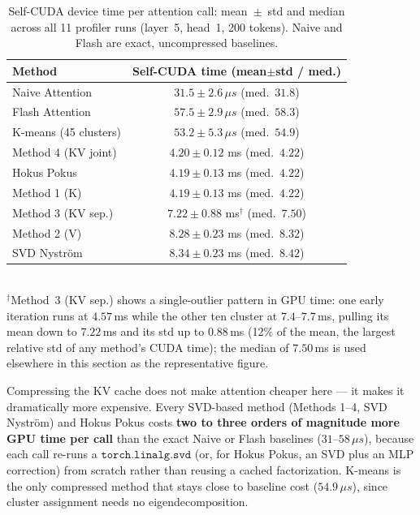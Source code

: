 \begin{table}[ht]
\centering
\caption{Self-CUDA device time per attention call: mean~$\pm$~std and median across all 11
profiler runs (layer~5, head~1, 200 tokens). Naive and Flash are exact, uncompressed
baselines.}
\label{tab:profiling_compute}
\begin{tabular}{l c}
\toprule
Method & Self-CUDA time (mean$\pm$std / med.) \\
\midrule
Naive Attention      & \shortstack{$31.5\pm2.6\,\mu s$ \\ (med.\ $31.8$)}   \\
Flash Attention      & \shortstack{$57.5\pm2.9\,\mu s$ \\ (med.\ $58.3$)}   \\
K-means (45 clusters) & \shortstack{$53.2\pm5.3\,\mu s$ \\ (med.\ $54.9$)}  \\
Method 4 (KV joint)  & \shortstack{$4.20\pm0.12$ ms \\ (med.\ $4.22$)}      \\
Hokus Pokus          & \shortstack{$4.19\pm0.13$ ms \\ (med.\ $4.22$)}     \\
Method 1 (K)         & \shortstack{$4.19\pm0.13$ ms \\ (med.\ $4.22$)}     \\
Method 3 (KV sep.)   & \shortstack{$7.22\pm0.88$ ms$^\dagger$ \\ (med.\ $7.50$)} \\
Method 2 (V)         & \shortstack{$8.28\pm0.23$ ms \\ (med.\ $8.32$)}     \\
SVD Nyström          & \shortstack{$8.34\pm0.23$ ms \\ (med.\ $8.42$)}     \\
\bottomrule
\end{tabular}
\\[2pt]
{\footnotesize $^\dagger$Method~3 (KV sep.) shows a single-outlier pattern in GPU time: one
early iteration runs at $4.57$\,ms while the other ten cluster at $7.4$--$7.7$\,ms, pulling its
mean down to $7.22$\,ms and its std up to $0.88$\,ms (12\% of the mean, the largest relative
std of any method's CUDA time); the median of $7.50$\,ms is used elsewhere in this section as
the representative figure.}
\end{table}

\noindent Compressing the KV cache does not make attention cheaper here --- it makes it
dramatically more expensive. Every SVD-based method (Methods 1--4, SVD Nyström) and Hokus
Pokus costs \textbf{two to three orders of magnitude more GPU time per call} than the exact
Naive or Flash baselines ($31$--$58\,\mu s$), because each call re-runs a $\texttt{torch.linalg.svd}$
(or, for Hokus Pokus, an SVD plus an MLP correction) from scratch rather than reusing a
cached factorization. K-means is the only compressed method that stays close to baseline cost
($54.9\,\mu s$), since cluster assignment needs no eigendecomposition.


